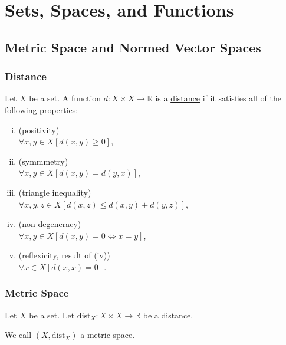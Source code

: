 \section{Sets, Spaces, and Functions}
\subsection*{Metric Space and Normed Vector Spaces}


\subsubsection*{Distance}
\udef Let $X$ be a set. A function $d \colon X \times X \to \mathbb{R}$
is a \ul{distance} if it satisfies all of the following properties:
\begin{enumerate}[(i)]
    \item (positivity)\\ $\forall x,y \in X \left[ d(x,y) \geq 0 \right]$,
    \item (symmmetry)\\ $\forall x,y \in X \left[ d(x,y) = d(y,x) \right]$,
    \item (triangle inequality)\\ $\forall x,y,z \in X \left[
        d(x,z) \leq d(x,y) + d(y,z) \right]$,
    \item (non-degeneracy)\\ $\forall x,y \in X \left[ d(x,y) = 0 \iff x = y \right]$,
    \item (reflexicity, result of (iv))\\ $\forall x \in X \left[ d(x,x) = 0 \right]$.
\end{enumerate}


\subsubsection*{Metric Space}
\udef Let $X$ be a set. Let $\text{dist}_X \colon X \times X \to \mathbb{R}$
be a distance.

We call $(X, \text{dist}_X)$ a \ul{metric space}.


